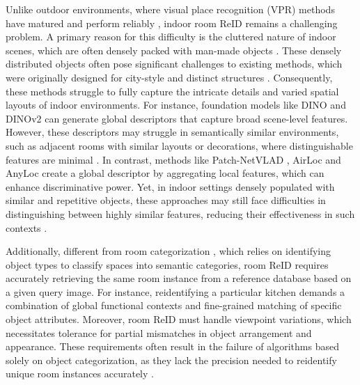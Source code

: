 Unlike outdoor environments, where visual place recognition (VPR) methods have matured and perform reliably \cite{arandjelović2016netvladcnnarchitectureweakly, hausler2021patchnetvladmultiscalefusionlocallyglobal, keetha2023anylocuniversalvisualplace}, indoor room ReID remains a challenging problem. A primary reason for this difficulty is the cluttered nature of indoor scenes, which are often densely packed with man-made objects \cite{xu2023clusvprefficientvisualplace}. These densely distributed objects often pose significant challenges to existing methods, which were originally designed for city-style and distinct structures \cite{7339473}. Consequently, these methods struggle to fully capture the intricate details and varied spatial layouts of indoor environments.
For instance, foundation models like DINO \cite{caron2021emergingpropertiesselfsupervisedvision} and DINOv2 \cite{oquab2024dinov2learningrobustvisual} can generate global descriptors that capture broad scene-level features. However, these descriptors may struggle in semantically similar environments, such as adjacent rooms with similar layouts or decorations, where distinguishable features are minimal \cite{cai2022patchnetvladlearnedpatchdescriptor}. In contrast, methods like Patch-NetVLAD \cite{hausler2021patchnetvladmultiscalefusionlocallyglobal}, AirLoc \cite{aryan2023airlocobjectbasedindoorrelocalization} and AnyLoc \cite{keetha2023anylocuniversalvisualplace} create a global descriptor by aggregating local features, which can enhance discriminative power. Yet, in indoor settings densely populated with similar and repetitive objects, these approaches may still face difficulties in distinguishing between highly similar features, reducing their effectiveness in such contexts \cite{sattler2019understandinglimitationscnnbasedabsolute}.

Additionally, different from room categorization \cite{lee2017roomnetendtoendroomlayout}, which relies on identifying object types to classify spaces into semantic categories, 
room ReID requires accurately retrieving the same room instance from a reference database based on a given query image. 
For instance, reidentifying a particular kitchen demands a combination of global functional contexts and fine-grained matching of specific object attributes. Moreover, room ReID must handle viewpoint variations, which necessitates tolerance for partial mismatches in object arrangement and appearance. These requirements often result in the failure of algorithms based solely on object categorization, as they lack the precision needed to reidentify unique room instances accurately \cite{Snderhauf2015PlaceRW}.

